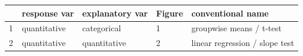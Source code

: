 \documentclass[]{book}
\begin{document}
\begin{longtable}[]{@{}lllll@{}}
\toprule
\begin{minipage}[b]{0.03\columnwidth}\raggedright
~\strut
\end{minipage} & \begin{minipage}[b]{0.24\columnwidth}\raggedright
response var\strut
\end{minipage} & \begin{minipage}[b]{0.29\columnwidth}\raggedright
explanatory var\strut
\end{minipage} & \begin{minipage}[b]{0.15\columnwidth}\raggedright
Figure\strut
\end{minipage} & \begin{minipage}[b]{0.14\columnwidth}\raggedright
conventional name\strut
\end{minipage}\tabularnewline
\midrule
\endhead
\begin{minipage}[t]{0.03\columnwidth}\raggedright
1\strut
\end{minipage} & \begin{minipage}[t]{0.24\columnwidth}\raggedright
quantitative\strut
\end{minipage} & \begin{minipage}[t]{0.29\columnwidth}\raggedright
categorical\strut
\end{minipage} & \begin{minipage}[t]{0.15\columnwidth}\raggedright
1\strut
\end{minipage} & \begin{minipage}[t]{0.14\columnwidth}\raggedright
groupwise means / t-test\strut
\end{minipage}\tabularnewline
\begin{minipage}[t]{0.03\columnwidth}\raggedright
2\strut
\end{minipage} & \begin{minipage}[t]{0.24\columnwidth}\raggedright
quantitative\strut
\end{minipage} & \begin{minipage}[t]{0.29\columnwidth}\raggedright
quantitative\strut
\end{minipage} & \begin{minipage}[t]{0.15\columnwidth}\raggedright
2\strut
\end{minipage} & \begin{minipage}[t]{0.14\columnwidth}\raggedright
linear regression / slope test\strut
\end{minipage}\tabularnewline

\end{longtable}
\end{document}
